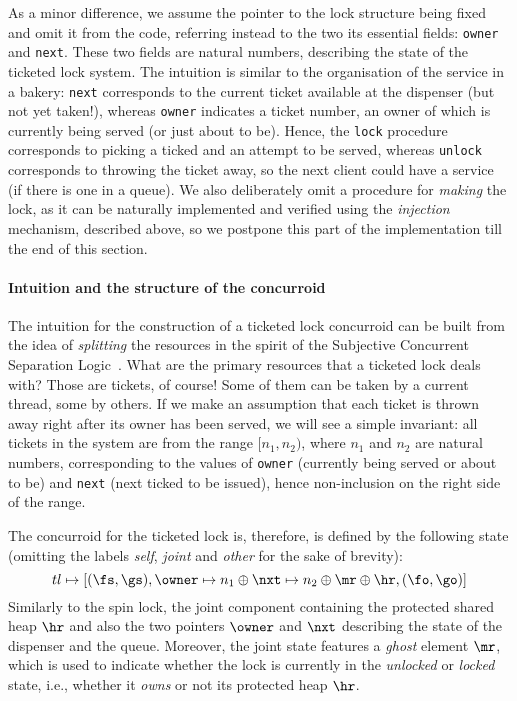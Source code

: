 As a minor difference, we assume the pointer to the lock structure
being fixed and omit it from the code, referring instead to the two
its essential fields: \texttt{owner} and \texttt{next}. These two
fields are natural numbers, describing the state of the ticketed lock
system. The intuition is similar to the organisation of the service in
a bakery: \texttt{next} corresponds to the current ticket available at
the dispenser (but not yet taken!), whereas \texttt{owner} indicates a
ticket number, an owner of which is currently being served (or just
about to be). Hence, the \texttt{lock} procedure corresponds to
picking a ticked and an attempt to be served, whereas \texttt{unlock}
corresponds to throwing the ticket away, so the next client could have
a service (if there is one in a queue).
%
We also deliberately omit a procedure for \emph{making} the lock, as
it can be naturally implemented and verified using the
\emph{injection} mechanism, described above, so we postpone this part
of the implementation till the end of this section. 

\paragraph{Intuition and the structure of the concurroid}

The intuition for the construction of a ticketed lock concurroid can
be built from the idea of \emph{splitting} the resources in the spirit
of the Subjective Concurrent Separation
Logic~\cite{LeyWild-Nanevski:POPL13}. What are the primary resources
that a ticketed lock deals with? Those are tickets, of course! Some of
them can be taken by a current thread, some by others. If we make an
assumption that each ticket is thrown away right after its owner has
been served, we will see a simple invariant: all tickets in the system
are from the range $[n_1, n_2)$, where $n_1$ and $n_2$ are natural
numbers, corresponding to the values of \texttt{owner} (currently
being served or about to be) and \texttt{next} (next ticked to be
issued), hence non-inclusion on the right side of the range.

The concurroid for the ticketed lock is, therefore, is defined by the
following state (omitting the labels \emph{self}, \emph{joint} and
\emph{other} for the sake of brevity):
%
\[
tl \mapsto [(\fs, \gs), \owner \mapsto n_1 \oplus \nxt \mapsto n_2 \oplus \mr
\oplus \hr, (\fo, \go)]
\]
%
Similarly to the spin lock, the joint component containing the protected
shared heap $\hr$ and also the two pointers $\owner$ and $\nxt$
describing the state of the dispenser and the queue. Moreover, the
joint state features a \emph{ghost} element $\mr$, which is used to
indicate whether the lock is currently in the \emph{unlocked} or
\emph{locked} state, i.e., whether it \emph{owns} or not its protected
heap $\hr$. 

